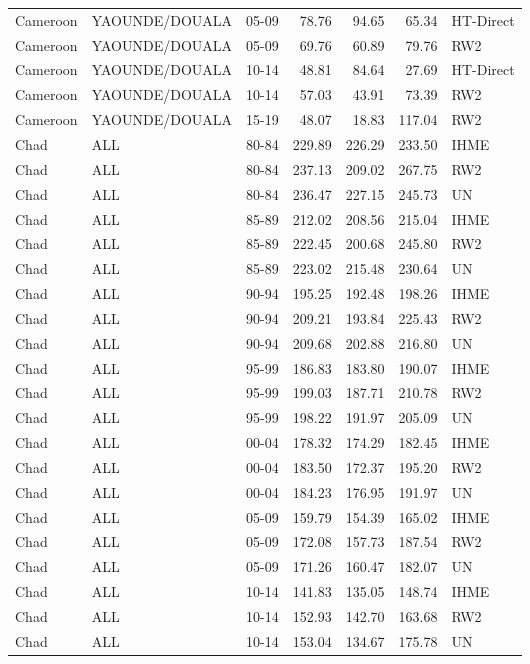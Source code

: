 \begin{longtable}{lllrrrl}
  Cameroon & YAOUNDE/DOUALA & 05-09 & 78.76 & 94.65 & 65.34 & HT-Direct \\ 
  Cameroon & YAOUNDE/DOUALA & 05-09 & 69.76 & 60.89 & 79.76 & RW2 \\ 
  Cameroon & YAOUNDE/DOUALA & 10-14 & 48.81 & 84.64 & 27.69 & HT-Direct \\ 
  Cameroon & YAOUNDE/DOUALA & 10-14 & 57.03 & 43.91 & 73.39 & RW2 \\ 
  Cameroon & YAOUNDE/DOUALA & 15-19 & 48.07 & 18.83 & 117.04 & RW2 \\ 
  Chad & ALL & 80-84 & 229.89 & 226.29 & 233.50 & IHME \\ 
  Chad & ALL & 80-84 & 237.13 & 209.02 & 267.75 & RW2 \\ 
  Chad & ALL & 80-84 & 236.47 & 227.15 & 245.73 & UN \\ 
  Chad & ALL & 85-89 & 212.02 & 208.56 & 215.04 & IHME \\ 
  Chad & ALL & 85-89 & 222.45 & 200.68 & 245.80 & RW2 \\ 
  Chad & ALL & 85-89 & 223.02 & 215.48 & 230.64 & UN \\ 
  Chad & ALL & 90-94 & 195.25 & 192.48 & 198.26 & IHME \\ 
  Chad & ALL & 90-94 & 209.21 & 193.84 & 225.43 & RW2 \\ 
  Chad & ALL & 90-94 & 209.68 & 202.88 & 216.80 & UN \\ 
  Chad & ALL & 95-99 & 186.83 & 183.80 & 190.07 & IHME \\ 
  Chad & ALL & 95-99 & 199.03 & 187.71 & 210.78 & RW2 \\ 
  Chad & ALL & 95-99 & 198.22 & 191.97 & 205.09 & UN \\ 
  Chad & ALL & 00-04 & 178.32 & 174.29 & 182.45 & IHME \\ 
  Chad & ALL & 00-04 & 183.50 & 172.37 & 195.20 & RW2 \\ 
  Chad & ALL & 00-04 & 184.23 & 176.95 & 191.97 & UN \\ 
  Chad & ALL & 05-09 & 159.79 & 154.39 & 165.02 & IHME \\ 
  Chad & ALL & 05-09 & 172.08 & 157.73 & 187.54 & RW2 \\ 
  Chad & ALL & 05-09 & 171.26 & 160.47 & 182.07 & UN \\ 
  Chad & ALL & 10-14 & 141.83 & 135.05 & 148.74 & IHME \\ 
  Chad & ALL & 10-14 & 152.93 & 142.70 & 163.68 & RW2 \\ 
  Chad & ALL & 10-14 & 153.04 & 134.67 & 175.78 & UN \\ 

\end{longtable}
